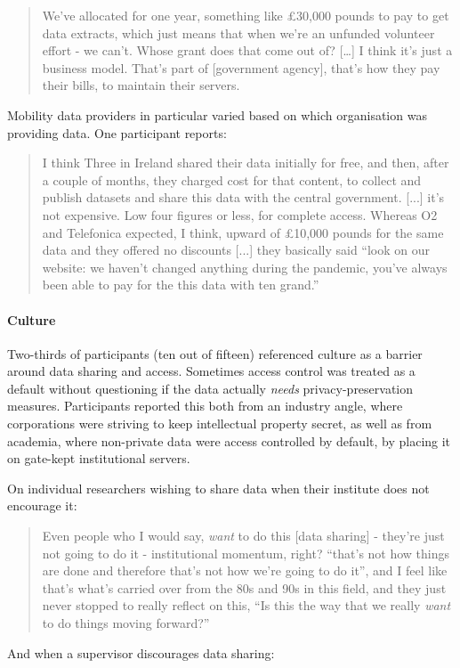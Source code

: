 \documentclass{CUP-JNL-DAP}%
\begin{document}
\blockquote{We've allocated for one year, something like £30,000 pounds to pay to get data extracts, which just means that when we're an unfunded volunteer effort - we can't. Whose grant does that come out of? […] I think it's just a business model. That's part of [government agency], that's how they pay their bills, to maintain their servers.}

Mobility data providers in particular varied based on which organisation was providing data. One participant reports:  

\blockquote{I think Three in Ireland shared their data initially for free, and then, after a couple of months, they charged cost for that content, to collect and publish datasets and share this data with the central government. [...] it's not expensive. Low four figures or less, for complete access. Whereas O2 and Telefonica expected, I think, upward of £10,000 pounds for the same data and they offered no discounts [...] they basically said \enquote{look on our website: we haven't changed anything during the pandemic, you've always been able to pay for the this data with ten grand.}}

\paragraph{Culture} 
Two-thirds of participants (ten out of fifteen) referenced culture as a barrier around data sharing and access. Sometimes access control was treated as a default without questioning if the data actually \textit{needs} privacy-preservation measures.  Participants reported this both from an industry angle, where corporations were striving to keep intellectual property secret, as well as from academia, where non-private data were access controlled by default, by placing it on gate-kept institutional servers.


On individual researchers wishing to share data when their institute does not encourage it: 

\blockquote{Even people who I would say, \textit{want} to do this [data sharing] - they're just not going to do it - institutional momentum, right? \enquote{that's not how things are done and therefore that's not how we're going to do it}, and I feel like that's what's carried over from the 80s and 90s in this field, and they just never stopped to really reflect on this, \enquote{Is this the way that we really \textit{want} to do things moving forward?}}

And when a supervisor discourages data sharing: 
\end{document}
